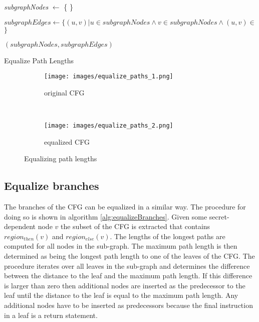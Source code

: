 \begin{algorithm*}
{   
  
  \textit{subgraphNodes} $\leftarrow$  \{ \} \\
   
  
  $subgraphEdges \leftarrow \{ (u, v) \vert u \in subgraphNodes \land v \in subgraphNodes \land (u, v) \in $  $\}$

	\KwRet $(subgraphNodes, subgraphEdges)$
  }
  
  \caption{Equalize Path Lengths}
  \label{alg:equalizePaths}
\end{algorithm*}

\begin{figure*}[t!]
    \centering
    \begin{subfigure}[t]{0.5\textwidth}
        \centering
        \texttt{[image: images/equalize\_paths\_1.png]}
        \caption{original CFG}
        \label{fig:equalize-paths-1}
    \end{subfigure}%
    ~
    \begin{subfigure}[t]{0.5\textwidth}
        \centering
        \texttt{[image: images/equalize\_paths\_2.png]}
        \caption{equalized CFG}
        \label{fig:equalize-paths-2}
    \end{subfigure}
    \caption{Equalizing path lengths}
    \label{fig:equalize-paths}
\end{figure*}

\subsection{Equalize branches}
The branches of the CFG can be equalized in a similar way. 
The procedure for doing so is shown in algorithm \ref{alg:equalizeBranches}.
Given some secret-dependent node $v$ the subset of the CFG is extracted that contains $region_{then}(v)$ and $region_{else}(v)$. 
The lengths of the longest paths are computed for all nodes in the sub-graph. 
The maximum path length is then determined as being the longest path length to one of the leaves of the CFG.
The procedure iterates over all leaves in the sub-graph and determines the difference between the distance to the leaf and the maximum path length. 
If this difference is larger than zero then additional nodes are inserted as the predecessor to the leaf until the distance to the leaf is equal to the maximum 
path length. Any additional nodes have to be inserted as predecessors because the final instruction in a leaf is a return statement. 

